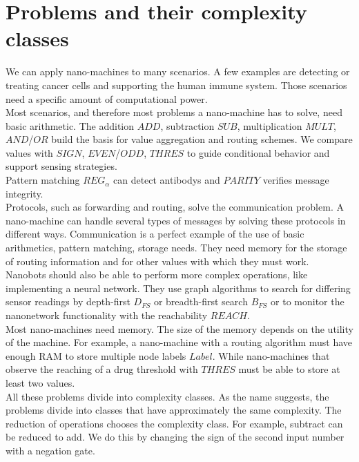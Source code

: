 \documentclass[10pt,sigconf]{acmart}
\begin{document}
\section{Problems and their complexity classes}
We can apply nano-machines to many scenarios.
A few examples are detecting or treating cancer cells and supporting the human immune system.
Those scenarios need a specific amount of computational power.\\
Most scenarios, and therefore most problems a nano-machine has to solve, need basic arithmetic.
The addition $ADD$, subtraction $SUB$, multiplication $MULT$, $AND$/$OR$ build the basis for value aggregation and routing schemes.
We compare values with $SIGN$, $EVEN$/$ODD$, $THRES$ to guide conditional behavior and support sensing strategies.\\
Pattern matching $REG_{\alpha}$ can detect antibodys and $PARITY$ verifies message integrity.\\
Protocols, such as forwarding and routing, solve the communication problem. 
A nano-machine can handle several types of messages by solving these protocols in different ways.
Communication is a perfect example of the use of basic arithmetics, pattern matching, storage needs.
They need memory for the storage of routing information and for other values with which they must work.\\
Nanobots should also be able to perform more complex operations, like implementing a neural network.
They use graph algorithms to search for differing sensor readings by depth-first $D_{FS}$ or breadth-first search $B_{FS}$ or to monitor the nanonetwork functionality with the reachability $REACH$.\\
Most nano-machines need memory. The size of the memory depends on the utility of the machine.
For example, a nano-machine with a routing algorithm must have enough RAM to store multiple node labels $Label$.
While nano-machines that observe the reaching of a drug threshold with $THRES$ must be able to store at least two values.\\
All these problems divide into complexity classes.
As the name suggests, the problems divide into classes that have approximately the same complexity.
The reduction of operations chooses the complexity class. For example, subtract can be reduced to add. 
We do this by changing the sign of the second input number with a negation gate. \\
\end{document}
